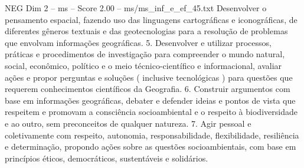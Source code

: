\begin{textsample}{NEG Dim 2 – ms – Score 2.00 – ms/ms\_inf\_e\_ef\_45.txt}
Desenvolver o pensamento espacial, fazendo uso das linguagens cartográficas e iconográficas, de diferentes gêneros textuais e das geotecnologias para a resolução de problemas que envolvam informações geográficas. 5.
Desenvolver e utilizar processos, práticas e procedimentos de investigação para compreender o mundo natural, social, econômico, político e o meio técnico-científico e informacional, avaliar ações e propor perguntas e soluções ( inclusive tecnológicas ) para questões que requerem conhecimentos científicos da Geografia. 6.
Construir argumentos com base em informações geográficas, debater e defender ideias e pontos de vista que respeitem e promovam a consciência socioambiental e o respeito à biodiversidade e ao outro, sem preconceitos de qualquer natureza. 7.
Agir pessoal e coletivamente com respeito, autonomia, responsabilidade, flexibilidade, resiliência e determinação, propondo ações sobre as questões socioambientais, com base em princípios éticos, democráticos, sustentáveis e solidários.

\end{textsample}

